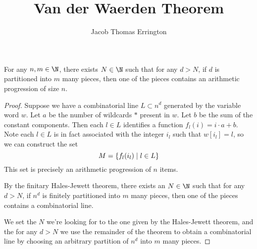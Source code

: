 \documentclass[11pt]{article}
\author{Jacob Thomas Errington}
\title{Van der Waerden Theorem}
\date{}
\begin{document}
\maketitle

\begin{prop}
    For any $n, m \in \N$, there exists $N \in \N$ such that for any $d > N$,
    if $d$ is partitioned into $m$ many pieces, then one of the pieces contains
    an arithmetic progression of size $n$.
\end{prop}

\begin{proof}
    Suppose we have a combinatorial line $L \subset n^d$ generated by the
    variable word $w$.
    Let $a$ be the number of wildcards $*$ present in $w$.
    Let $b$ be the sum of the constant components.
    Then each $l \in L$ identifies a function $f_l(i) = i \cdot a + b$.
    Note each $l \in L$ is in fact associated with the integer $i_l$ such that
    $w[i_l] = l$, so we can construct the set
    \begin{equation*}
        M = \left\{ f_l(i_l) \;\vert\; l \in L \right\}
    \end{equation*}
    This set is precisely an arithmetic progression of $n$ items.

    By the finitary Hales-Jewett theorem, there exists an $N \in \N$ such that
    for any $d > N$, if $n^d$ is finitely partitioned into $m$ many pieces,
    then one of the pieces contains a combinatorial line.

    We set the $N$ we're looking for to the one given by the Hales-Jewett
    theorem, and the for any $d > N$ we use the remainder of the theorem to
    obtain a combinatorial line by choosing an arbitrary partition of $n^d$
    into $m$ many pieces.
\end{proof}
\end{document}
